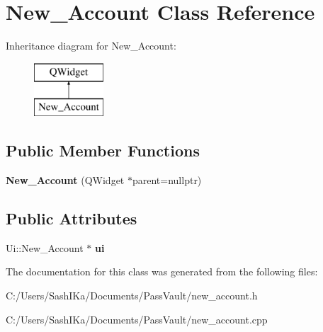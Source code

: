 \hypertarget{class_new___account}{}\section{New\+\_\+\+Account Class Reference}
\label{class_new___account}
Inheritance diagram for New\+\_\+\+Account\+:\begin{figure}[H]
\begin{center}
\leavevmode
\includegraphics[height=2.000000cm]{class_new___account}
\end{center}
\end{figure}
\subsection*{Public Member Functions}
\begin{DoxyCompactItemize}
\item 
\mbox{\label{class_new___account_a4bf1f992dd21ec84cc4deff239c57786}} 
{\bfseries New\+\_\+\+Account} (Q\+Widget $\ast$parent=nullptr)
\end{DoxyCompactItemize}
\subsection*{Public Attributes}
\begin{DoxyCompactItemize}
\item 
\mbox{\label{class_new___account_a4368a257dac562f27e2308103245f022}} 
Ui\+::\+New\+\_\+\+Account $\ast$ {\bfseries ui}
\end{DoxyCompactItemize}


The documentation for this class was generated from the following files\+:\begin{DoxyCompactItemize}
\item 
C\+:/\+Users/\+Sash\+I\+Ka/\+Documents/\+Pass\+Vault/new\+\_\+account.\+h\item 
C\+:/\+Users/\+Sash\+I\+Ka/\+Documents/\+Pass\+Vault/new\+\_\+account.\+cpp\end{DoxyCompactItemize}
